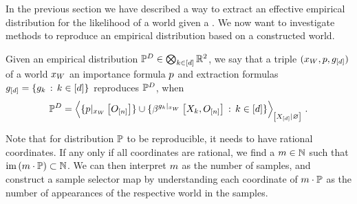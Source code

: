 




In the previous section we have described a way to extract an effective empirical distribution for the likelihood of a \firstOrderLogic{} world given a \HybridFOLNetwork{}.
We now want to investigate methods to reproduce an empirical distribution based on a constructed \firstOrderLogic{} world.

\begin{definition}
    Given an empirical distribution $\mathbb{P}^{D}\in\bigotimes_{k\in[d]}\mathbb{R}^2$, we say that a triple $(x_{W},p,g_{[d]})$ of a \firstOrderLogic{} world $x_{W}$ an importance formula $p$ and extraction formulas $g_{[d]}=\{g_{k}\,:\,k\in[d]\}$ reproduces $\mathbb{P}^{D}$, when
    \begin{align*}
        \empdistribution
        = \normalizationof{\{\groundingofat{\impformula}{\shortindvariables}\}\cup
        \{\bencodingofat{\kggroundingof{\extformulaof{\atomenumerator}}}{\catvariableof{\catenumerator},\shortindvariables} \wcols \atomenumeratorin\}
        }{\shortcatvariables} \, .
    \end{align*}
\end{definition}

Note that for distribution $\mathbb{P}$ to be reproducible, it needs to have rational coordinates. %
If any only if all coordinates are rational, we find a $m\in\mathbb{N}$ such that $\mathrm{im}\left(m\cdot\mathbb{P}\right)\subset\mathbb{N}$.
We can then interpret $m$ as the number of samples, and construct a sample selector map by understanding each coordinate of $m\cdot\mathbb{P}$ as the number of appearances of the respective world in the samples.


